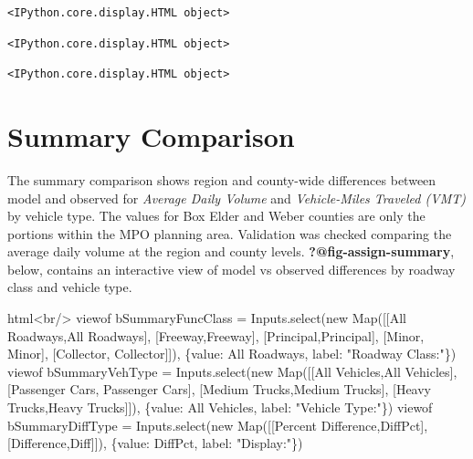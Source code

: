\documentclass[
  letterpaper,
  DIV=11,
  numbers=noendperiod]{scrreprt}
\newenvironment{Shaded}{\begin{snugshade}}{\end{snugshade}}
\newcommand{\NormalTok}[1]{\textcolor[rgb]{0.00,0.23,0.31}{#1}}
\begin{document}
\begin{verbatim}
<IPython.core.display.HTML object>
\end{verbatim}

\begin{verbatim}
<IPython.core.display.HTML object>
\end{verbatim}

\begin{verbatim}
<IPython.core.display.HTML object>
\end{verbatim}

\hypertarget{summary-comparison}{%
\section{Summary Comparison}\label{summary-comparison}}

The summary comparison shows region and county-wide differences between
model and observed for \emph{Average Daily Volume} and
\emph{Vehicle-Miles Traveled (VMT)} by vehicle type. The values for Box
Elder and Weber counties are only the portions within the MPO planning
area. Validation was checked comparing the average daily volume at the
region and county levels. \textbf{?@fig-assign-summary}, below, contains
an interactive view of model vs observed differences by roadway class
and vehicle type.

\begin{Shaded}
\begin{Highlighting}[]
\NormalTok{html\textasciigrave{}\textless{}br/\textgreater{}\textasciigrave{}}
\NormalTok{viewof bSummaryFuncClass = Inputs.select(new Map([[\textquotesingle{}All Roadways\textquotesingle{},\textquotesingle{}All Roadways\textquotesingle{}], [\textquotesingle{}Freeway\textquotesingle{},\textquotesingle{}Freeway\textquotesingle{}], [\textquotesingle{}Principal\textquotesingle{},\textquotesingle{}Principal\textquotesingle{}], [\textquotesingle{}Minor\textquotesingle{}, \textquotesingle{}Minor\textquotesingle{}], [\textquotesingle{}Collector\textquotesingle{}, \textquotesingle{}Collector\textquotesingle{}]]), \{value: \textquotesingle{}All Roadways\textquotesingle{}, label: "Roadway Class:"\})}
\NormalTok{viewof bSummaryVehType = Inputs.select(new Map([[\textquotesingle{}All Vehicles\textquotesingle{},\textquotesingle{}All Vehicles\textquotesingle{}], [\textquotesingle{}Passenger Cars\textquotesingle{}, \textquotesingle{}Passenger Cars\textquotesingle{}], [\textquotesingle{}Medium Trucks\textquotesingle{},\textquotesingle{}Medium Trucks\textquotesingle{}], [\textquotesingle{}Heavy Trucks\textquotesingle{},\textquotesingle{}Heavy Trucks\textquotesingle{}]]), \{value: \textquotesingle{}All Vehicles\textquotesingle{}, label: "Vehicle Type:"\})}
\NormalTok{viewof bSummaryDiffType = Inputs.select(new Map([[\textquotesingle{}Percent Difference\textquotesingle{},\textquotesingle{}DiffPct\textquotesingle{}], [\textquotesingle{}Difference\textquotesingle{},\textquotesingle{}Diff\textquotesingle{}]]), \{value: \textquotesingle{}DiffPct\textquotesingle{}, label: "Display:"\})}
\end{Highlighting}
\end{Shaded}
\end{document}
